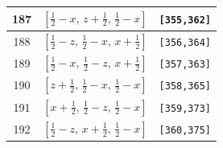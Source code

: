 \documentclass[fleqn,8pt]{jsarticle}
\begin{document}
\begin{longtable}{ccc}
187 & $\left[ \frac{1}{2} - x,\, z + \frac{1}{2},\, \frac{1}{2} - x \right]$ & {\tt [355,362]} \\ \hline
188 & $\left[ \frac{1}{2} - z,\, \frac{1}{2} - x,\, x + \frac{1}{2} \right]$ & {\tt [356,364]} \\ \hline
189 & $\left[ \frac{1}{2} - x,\, \frac{1}{2} - z,\, x + \frac{1}{2} \right]$ & {\tt [357,363]} \\ \hline
190 & $\left[ z + \frac{1}{2},\, \frac{1}{2} - x,\, \frac{1}{2} - x \right]$ & {\tt [358,365]} \\ \hline
191 & $\left[ x + \frac{1}{2},\, \frac{1}{2} - z,\, \frac{1}{2} - x \right]$ & {\tt [359,373]} \\ \hline
192 & $\left[ \frac{1}{2} - z,\, x + \frac{1}{2},\, \frac{1}{2} - x \right]$ & {\tt [360,375]} \\
\end{longtable}
\renewcommand{\arraystretch}{1.2}
\end{document}
